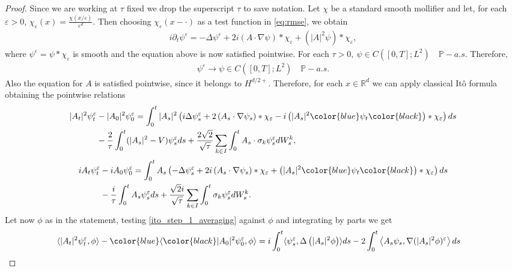 \documentclass[a4paper,10pt]{amsart}
\newcommand{\R}{\mathbb{R}}
\renewcommand{\epsilon}{\varepsilon}
\newcommand{\Bk}{\color{black}}
\newcommand{\Bl}{\color{blue}}
\theoremstyle{remark}
\numberwithin{equation}{section}
\begin{document}
\iffalse
\begin{proof}
   Since we are working at $\tau$ fixed we drop the superscript $\tau$ to save notation. Let $\chi$ be a standard smooth mollifier and let, for each $\epsilon>0$, $\chi_{\epsilon}(x)=\frac{\chi(x/\epsilon)}{\epsilon^d}$. Then choosing $\chi_\epsilon(x-\cdot)$ as a test function in \eqref{eq:rmse}, we obtain
   \begin{align*}
       i\partial_t\psi^{\epsilon}=-\Delta\psi^{\epsilon}+ 2i\left(A\cdot\nabla \psi\right)\ast \chi_{\epsilon}+\left(|A|^2\psi\right)\ast \chi_{\epsilon},
   \end{align*}
   where $\psi^{\epsilon}=\psi\ast \chi_{\epsilon}$ is smooth and the equation above is now satisfied pointwise. For each $\tau>0,\ \psi\in C([0,T];L^2)\quad\mathbb{P}-a.s.$ Therefore, 
   \begin{align}\label{convergence_convolution_averaging}
       \psi^{\epsilon}\rightarrow \psi \in C([0,T];L^2)\quad\mathbb{P}-a.s.
   \end{align}
   Also the equation for $A$ is satisfied pointwise, since it belongs to $H^{d/2+}.$ Therefore, for each $x\in \R^d$ we can apply classical It\^o formula obtaining the pointwise relations
   \begin{align}\label{ito_step_1_averaging}
     |A_t|^2\psi^{\epsilon}_t&-|A_0|^2\psi^{\epsilon}_0=\int_0^t|A_s|^2\left(i\Delta\psi^{\epsilon}_s+ 2\left(A_s\cdot\nabla \psi_s\right)\ast \chi_{\epsilon}-i\left(|A_s|^2\Bl\psi_t\Bk\right)\ast \chi_{\epsilon}\right)ds\notag\\ & -\frac{2}{\tau}\int_0^t (|A_s|^2-V)\psi^{\epsilon}_s ds+\frac{2\sqrt{2}}{\sqrt{\tau}}\sum_{k\in I }\int_0^t A_s\cdot \sigma_k \psi^{\epsilon}_s dW^k_s,
   \end{align}
   \begin{align}\label{ito_step_2_averaging}
     iA_t  \psi^{\epsilon}_t&-iA_0  \psi^{\epsilon}_0=\int_0^t A_s\left(-\Delta\psi^{\epsilon}_s+ 2i\left(A_s\cdot\nabla \psi_s\right)\ast \chi_{\epsilon}+\left(|A_s|^2\Bl\psi_t\Bk \right)\ast \chi_{\epsilon}\right)ds\notag\\ & -\frac{i}{\tau}\int_0^t A_s\psi^{\epsilon}_s ds+\frac{\sqrt{2}i}{\sqrt{\tau}}\sum_{k\in I }\int_0^t  \sigma_k \psi^{\epsilon}_s dW^k_s.
   \end{align}
   Let now $\phi$ as in the statement, testing \eqref{ito_step_1_averaging} against $\phi$ and integrating by parts we get
   \begin{align}\label{ito_step_3_averaging}
     \langle |A_t|^2\psi^{\epsilon}_t,\phi\rangle&-\Bl\langle\Bk|A_0|^2\psi^{\epsilon}_0,\phi\rangle=i\int_0^t\langle\psi^{\epsilon}_s,\Delta\left(|A_s|^2 \phi\right)\rangle ds -2\int_0^t\left\langle A_s\psi_s, \nabla (|A_s|^2\phi)^{\epsilon}\right\rangle ds \notag

\end{align}
\end{proof}
\end{document}
